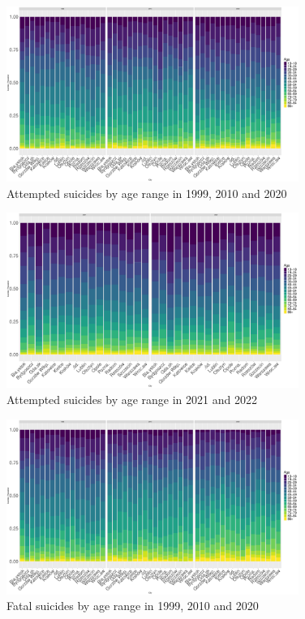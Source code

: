 \documentclass{article}
\begin{document}
%
%
%
\begin{figure}[H]
    \centering
    \includegraphics[width=0.85\textwidth]{imgs/age_city_att_op-991020.pdf}
    \caption{Attempted suicides by age range in 1999, 2010 and 2020}
    \label{fig:age_city_att_op-991020}
\end{figure}

\begin{figure}[H]
    \centering
    \includegraphics[width=0.85\textwidth]{imgs/age_city_op-2122.pdf}
    \caption{Attempted suicides by age range in 2021 and 2022}
    \label{fig:age_city_att_op-2122}
\end{figure}

\begin{figure}[H]
    \centering
    \includegraphics[width=0.85\textwidth]{imgs/age_city_fat_op-991020.pdf}
    \caption{Fatal suicides by age range in 1999, 2010 and 2020}
    \label{fig:age_city_fat_op-991020}
\end{figure}
\end{document}
